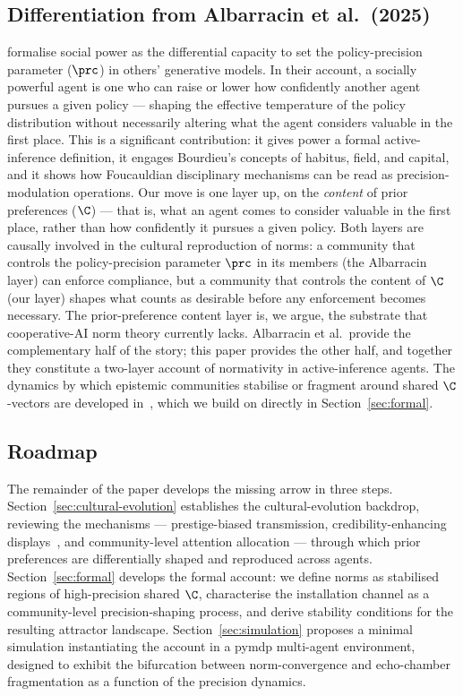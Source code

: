 \subsection*{Differentiation from Albarracin et al.\ (2025)}

\citet{albarracin2025SocialPower} formalise social power as the differential
capacity to set the policy-precision parameter ($\prc$) in others' generative
models. In their account, a socially powerful agent is one who can raise or
lower how confidently another agent pursues a given policy --- shaping the
effective temperature of the policy distribution without necessarily altering
what the agent considers valuable in the first place. This is a significant
contribution: it gives power a formal active-inference definition, it engages
Bourdieu's concepts of habitus, field, and capital, and it shows how
Foucauldian disciplinary mechanisms can be read as precision-modulation
operations. Our move is one layer up, on the \textit{content} of prior
preferences ($\C$) --- that is, what an agent comes to consider valuable
in the first place, rather than how confidently it pursues a given policy.
Both layers are causally involved in the cultural reproduction of norms:
a community that controls the policy-precision parameter $\prc$ in its
members (the Albarracin layer) can enforce compliance, but a community that
controls the content of $\C$ (our layer) shapes what counts as desirable
before any enforcement becomes necessary. The prior-preference content layer
is, we argue, the substrate that cooperative-AI norm theory currently lacks.
Albarracin et al.\ provide the complementary half of the story; this paper
provides the other half, and together they constitute a two-layer account of
normativity in active-inference agents. The dynamics by which epistemic
communities stabilise or fragment around shared $\C$-vectors are developed
in~\citet{albarracin2022EpistemicCommunities}, which we build on directly
in Section~\ref{sec:formal}.

\subsection*{Roadmap}

The remainder of the paper develops the missing arrow in three steps.
Section~\ref{sec:cultural-evolution} establishes the cultural-evolution backdrop,
reviewing the mechanisms --- prestige-biased transmission, credibility-enhancing
displays~\citep{henrich2009CREDs}, and community-level attention allocation ---
through which prior preferences are differentially shaped and reproduced across
agents.
Section~\ref{sec:formal} develops the formal account: we define norms as
stabilised regions of high-precision shared $\C$, characterise the installation
channel as a community-level precision-shaping process, and derive stability
conditions for the resulting attractor landscape.
Section~\ref{sec:simulation} proposes a minimal simulation instantiating the
account in a pymdp multi-agent environment, designed to exhibit the bifurcation
between norm-convergence and echo-chamber fragmentation as a function of
the precision dynamics.
